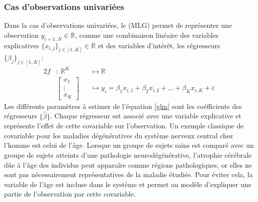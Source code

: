 \subsubsection*{Cas d'observations univariées}
Dans la cas d'observations univariées, le \mlg (MLG) permet de représenter une observation $y_{i=1..N} \in \mathbb{R}$, 
comme une combinaison linéaire des variables explicatives $\{x_{i,j}\}_{j \in [1..K]} \in \mathbb{R}$ 
et des variables d'intérêt, les régresseurs $\{\beta_j\}_{j \in [1..K]}$:
\begin{alignat}{2}
    f &:\ \mathbb{R}^{K} &&\mapsto \mathbb{R} \nonumber \\
    &{}\left[\begin{array}{c}
x_{1}\\
\vdots\\
x_{K}
\end{array}\right] &&\mapsto y_i = \beta_{1}x_{i,1} + \beta_{2}x_{i,2} + \dots + \beta_{K}x_{i,K} + \varepsilon
\label{glm}
\end{alignat}
Les différents paramètres à estimer de l'équation \eqref{glm} sont les coéfficients des régresseurs $\{\hat{\beta}\}$.
Chaque régresseur est associé avec une variable explicative et représente l'effet de cette covariable sur l'observation.
Un exemple classique de covariable pour les maladies dégénératives du système nerveux central chez l'homme est celui de l'âge. 
Lorsque un groupe de sujets sains est comparé avec un groupe de sujets atteints d'une pathologie neurodégénérative, 
l'atrophie cérébrale dûe à l'âge des individus peut apparaîre comme régions pathologiques, or elles ne sont pas nécessairement représentatives de la maladie étudiée.
Pour éviter cela, la variable de l'âge est incluse dans le système et permet au modèle d'expliquer une partie de l'observation par cette covariable.

